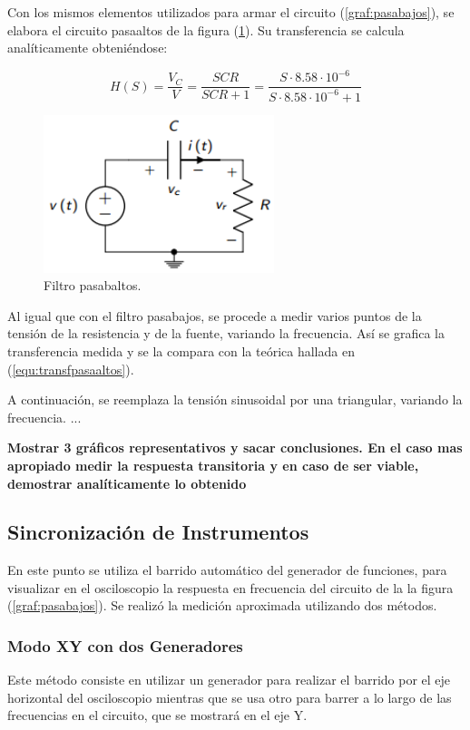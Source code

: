 \documentclass[a4paper]{article}
\begin{document}
Con los mismos elementos utilizados para armar el circuito (\ref{graf:pasabajos}), se elabora el circuito pasaaltos de la figura (\ref{graf:pasaaltos}). Su transferencia se calcula analíticamente obteniéndose:

\begin{equation}
	H \left(S \right) = \frac{V_C}{V} = \frac{SCR}{SCR + 1} = \frac{S \cdot 8.58 \cdot 10^{-6}}{S \cdot 8.58 \cdot 10^{-6} + 1}
	\label{equ:transfpasaaltos}
\end{equation}

\begin{figure}[H]
	\centering
	\includegraphics[width=0.6\textwidth]{Filtro-pasaaltos.PNG}
	\caption{Filtro pasabaltos.} 
	\label{graf:pasaaltos}
\end{figure}

Al igual que con el filtro pasabajos, se procede a medir varios puntos de la tensión de la resistencia y de la fuente, variando la frecuencia. Así se grafica la transferencia medida y se la compara con la teórica hallada en (\ref{equ:transfpasaaltos}).

A continuación, se reemplaza la tensión sinusoidal por una triangular, variando la frecuencia. ...

\textbf{Mostrar 3 gráficos representativos y sacar conclusiones. En el caso mas apropiado medir la respuesta transitoria y en caso de ser viable, demostrar analíticamente lo obtenido}

\subsection*{Sincronización de Instrumentos}
En este punto se utiliza el barrido automático del generador de funciones, para visualizar en el osciloscopio la respuesta en frecuencia del circuito de la la figura (\ref{graf:pasabajos}). Se realizó la medición aproximada utilizando dos métodos.

\subsubsection*{Modo XY con dos Generadores}
Este método consiste en utilizar un generador para realizar el barrido por el eje horizontal del osciloscopio mientras que se usa otro para barrer a lo largo de las frecuencias en el circuito, que se mostrará en el eje Y.
\end{document}
